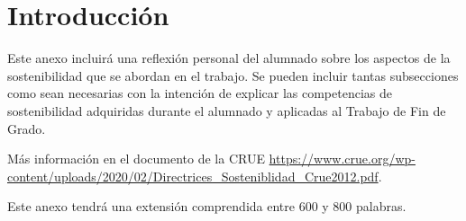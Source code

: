 
\section{Introducción}
Este anexo incluirá una reflexión personal del alumnado sobre los aspectos de la sostenibilidad que se abordan en el trabajo.
Se pueden incluir tantas subsecciones como sean necesarias con la intención de explicar las competencias de sostenibilidad adquiridas durante el alumnado y aplicadas al Trabajo de Fin de Grado.

Más información en el documento de la CRUE \url{https://www.crue.org/wp-content/uploads/2020/02/Directrices_Sosteniblidad_Crue2012.pdf}.
\cite{wiki:latex, koza92}

Este anexo tendrá una extensión comprendida entre 600 y 800 palabras.
